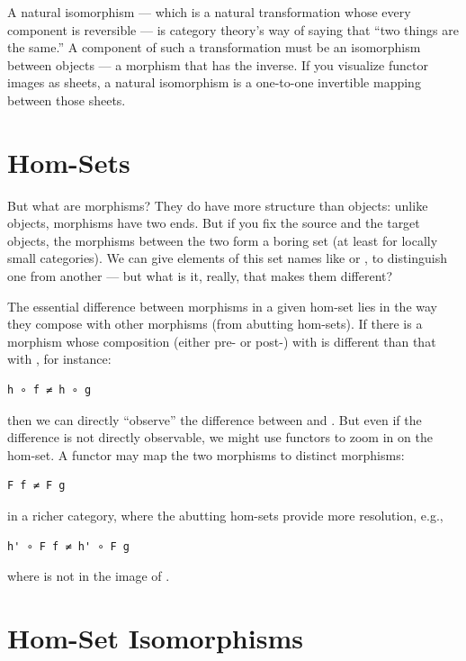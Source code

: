 A natural isomorphism --- which is a natural transformation whose every
component is reversible --- is category theory's way of saying that
``two things are the same.'' A component of such a transformation must
be an isomorphism between objects --- a morphism that has the inverse.
If you visualize functor images as sheets, a natural isomorphism is a
one-to-one invertible mapping between those sheets.

\section{Hom-Sets}\label{hom-sets}

But what are morphisms? They do have more structure than objects: unlike
objects, morphisms have two ends. But if you fix the source and the
target objects, the morphisms between the two form a boring set (at
least for locally small categories). We can give elements of this set
names like  or , to distinguish one from another ---
but what is it, really, that makes them different?

The essential difference between morphisms in a given hom-set lies in
the way they compose with other morphisms (from abutting hom-sets). If
there is a morphism  whose composition (either pre- or post-)
with  is different than that with , for instance:

\begin{verbatim}
h ∘ f ≠ h ∘ g
\end{verbatim}

then we can directly ``observe'' the difference between  and
. But even if the difference is not directly observable, we
might use functors to zoom in on the hom-set. A functor  may
map the two morphisms to distinct morphisms:

\begin{verbatim}
F f ≠ F g
\end{verbatim}

in a richer category, where the abutting hom-sets provide more
resolution, e.g.,

\begin{verbatim}
h' ∘ F f ≠ h' ∘ F g
\end{verbatim}

where  is not in the image of .

\section{Hom-Set Isomorphisms}\label{hom-set-isomorphisms}


